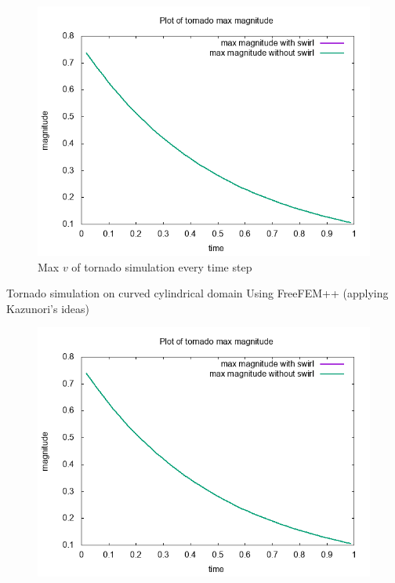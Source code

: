 \documentclass{beamer}
\begin{document}
\begin{frame}
\begin{figure}
	\centering
	\includegraphics[width=0.9\linewidth]{NS_3D/magnitude_tornado}
	\caption{Max $ v $ of tornado simulation every time step}
	\label{fig:magnitudetornado}
\end{figure}
\end{frame}

\begin{frame}{Tornado simulation on curved cylindrical domain}
Using FreeFEM++ (applying Kazunori's ideas)
\begin{figure}
	\centering
	\includegraphics[width=0.9\linewidth]{NS_3D/curved}
	\caption{}
	\label{fig:curved}
\end{figure}
\end{frame}
\end{document}
